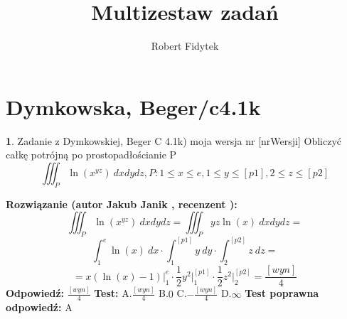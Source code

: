 \documentclass[12pt, a4paper]{article}
\title{Multizestaw zadań}
\author{Robert Fidytek}
\date{}
\theoremstyle{definition} %
\newtheorem{zad}{}
\newcommand{\kategoria}[1]{\section{#1}} %
\newcommand{\zadStart}[1]{\begin{zad}#1\newline} %
\newcommand{\zadStop}{\end{zad}}   %
\newcommand{\rozwStart}[2]{\noindent \textbf{Rozwiązanie (autor #1 , recenzent #2): }\newline} %
\newcommand{\rozwStop}{\newline}                                            %
\newcommand{\odpStart}{\noindent \textbf{Odpowiedź:}\newline}    %
\newcommand{\odpStop}{\newline}                                             %
\newcommand{\testStart}{\noindent \textbf{Test:}\newline} %
\newcommand{\testStop}{\newline} %
\newcommand{\kluczStart}{\noindent \textbf{Test poprawna odpowiedź:}\newline} %
\newcommand{\kluczStop}{\newline} %
\begin{document}
\maketitle


\kategoria{Dymkowska, Beger/c4.1k}
\zadStart{Zadanie z Dymkowskiej, Beger C 4.1k) moja wersja nr [nrWersji]}
Obliczyć całkę potrójną po prostopadłościanie P $$\iiint_P \ln{(x^{yz})}\ dxdydz, P: 1 \leq x \leq e, 1 \leq y \leq [p1], 2 \leq z \leq [p2]$$
\zadStop
\rozwStart{Jakub Janik}{}
$$\iiint_P \ln{(x^{yz})}\ dxdydz=\iiint_P yz\ln{(x)}\ dxdydz=$$
$$\int_1^e \ln{(x)}\ dx \cdot \int_1^{[p1]}y\ dy\cdot\int_2^{[p2]}z\ dz=$$
$$=x(\ln{(x)}-1)\Big|_1^e\cdot\frac{1}{2}y^2\Big|_1^{[p1]}\cdot\frac{1}{2}z^2\Big|_2^{[p2]}=\frac{[wyn]}{4}$$
\rozwStop
\odpStart
$\frac{[wyn]}{4}$
\odpStop
\testStart
A.$\frac{[wyn]}{4}$
B.$0$
C.$-\frac{[wyn]}{4}$
D.$\infty$
\testStop
\kluczStart
A
\kluczStop
\end{document}
